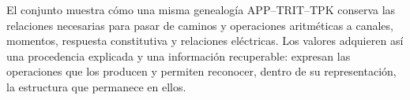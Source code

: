 El conjunto muestra cómo una misma genealogía APP--TRIT--TPK conserva
las relaciones necesarias para pasar de caminos y operaciones
aritméticas a canales, momentos, respuesta constitutiva y relaciones
eléctricas. Los valores adquieren así una procedencia explicada y
una información recuperable: expresan las operaciones que los
producen y permiten reconocer, dentro de su representación, la
estructura que permanece en ellos.
\par\endgroup
